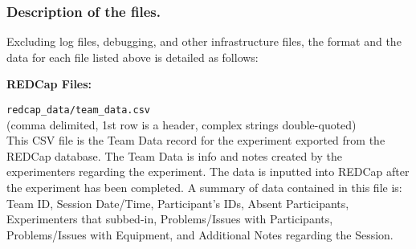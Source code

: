\subsubsection{Description of the files.}

\noindent
Excluding log files, debugging, and other infrastructure files, the format and
the data for each file listed above is detailed as follows: \\


\begin{description}
\item\textbf{REDCap Files:}
\medskip
\item\verb|redcap_data/team_data.csv|\\(comma delimited, 1st row is a header, complex strings double-quoted)\\
This CSV file is the Team Data record for the experiment exported from the REDCap database. The Team Data is info and notes created by the experimenters regarding the experiment. The data is inputted into REDCap after the experiment has been completed. A summary of data contained in this file is: Team ID, Session Date/Time, Participant's IDs, Absent Participants, Experimenters that subbed-in, Problems/Issues with Participants, Problems/Issues with Equipment, and Additional Notes regarding the Session.


\end{description}
